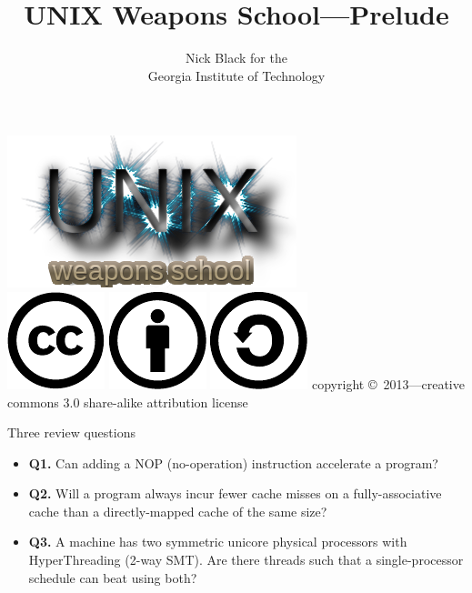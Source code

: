\documentclass[handout]{beamer}
\title{UNIX Weapons School---Prelude}
\date{}
\author{Nick Black for the\\
Georgia Institute of Technology
}
\begin{document}
\begin{frame}
\titlepage
\begin{center}
\includegraphics[scale=0.33]{images/uws.png}\\
\vspace{.25in}
\includegraphics[scale=.25]{images/cc-logo.pdf}
\includegraphics[scale=.25]{images/cc-new.pdf}
\includegraphics[scale=.25]{images/cc-share.pdf}
\tiny{copyright \copyright\ 2013---creative commons 3.0 share-alike attribution license}
\end{center}
\end{frame}

\begin{frame}{Three review questions}
\begin{itemize}
\item \textbf{Q1.} Can adding a NOP (no-operation) instruction accelerate a program?
\item \textbf{Q2.} Will a program always incur fewer cache misses on a fully-associative
	cache than a directly-mapped cache of the same size?
\item \textbf{Q3.} A machine has two symmetric unicore physical processors with HyperThreading
	(2-way SMT). Are there threads such that a single-processor
	schedule can beat using both?
\end{itemize}
\end{frame}
\end{document}
